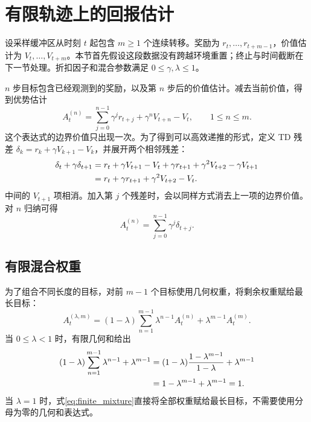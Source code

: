 \section{有限轨迹上的回报估计}\label{sec:gae}
设采样缓冲区从时刻 $t$ 起包含 $m\geq1$ 个连续转移。奖励为 $r_t,\ldots,r_{t+m-1}$，价值估计为 $V_t,\ldots,V_{t+m}$。本节首先假设这段数据没有跨越环境重置；终止与时间截断在下一节处理。折扣因子和混合参数满足 $0\leq\gamma,\lambda\leq1$。

$n$ 步目标包含已经观测到的奖励，以及第 $n$ 步后的价值估计。减去当前价值，得到优势估计
\begin{equation}\label{eq:nstep}
 A_t^{(n)}=\sum_{j=0}^{n-1}\gamma^j r_{t+j}+\gamma^n V_{t+n}-V_t,
 \qquad 1\leq n\leq m.
\end{equation}
这个表达式的边界价值只出现一次。为了得到可以高效递推的形式，定义 TD 残差 $\delta_k=r_k+\gamma V_{k+1}-V_k$，并展开两个相邻残差：
\begin{align}\label{eq:telescoping}
 \delta_t+\gamma\delta_{t+1}
 &=r_t+\gamma V_{t+1}-V_t
   +\gamma r_{t+1}+\gamma^2V_{t+2}-\gamma V_{t+1}\notag\\
 &=r_t+\gamma r_{t+1}+\gamma^2V_{t+2}-V_t.
\end{align}
中间的 $V_{t+1}$ 项相消。加入第 $j$ 个残差时，会以同样方式消去上一项的边界价值。对 $n$ 归纳可得
\begin{equation}\label{eq:nstep_residual}
 A_t^{(n)}=\sum_{j=0}^{n-1}\gamma^j\delta_{t+j}.
\end{equation}

\subsection{有限混合权重}
为了组合不同长度的目标，对前 $m-1$ 个目标使用几何权重，将剩余权重赋给最长目标：
\begin{equation}\label{eq:finite_mixture}
 A_t^{(\lambda,m)}=(1-\lambda)\sum_{n=1}^{m-1}\lambda^{n-1}A_t^{(n)}
                 +\lambda^{m-1}A_t^{(m)}.
\end{equation}
当 $0\leq\lambda<1$ 时，有限几何和给出
\begin{align}\label{eq:weight_sum}
 (1-\lambda)\sum_{n=1}^{m-1}\lambda^{n-1}+\lambda^{m-1}
 &=(1-\lambda)\frac{1-\lambda^{m-1}}{1-\lambda}+\lambda^{m-1}\notag\\
 &=1-\lambda^{m-1}+\lambda^{m-1}=1.
\end{align}
当 $\lambda=1$ 时，式\eqref{eq:finite_mixture}直接将全部权重赋给最长目标，不需要使用分母为零的几何和表达式。

